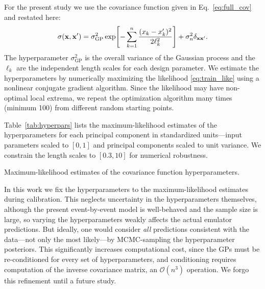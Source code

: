 \documentclass[aps,prc,reprint,superscriptaddress,amsmath]{revtex4-1}
\begin{document}
For the present study we use the covariance function given in Eq.~\eqref{eq:full_cov} and restated here:
\begin{equation*}
  \sigma(\mathbf x, \mathbf x') = \sigma_\text{GP}^2 \exp\Biggl[ -\sum_{k=1}^n \frac{(x_k - x'_k)^2}{2\ell_k^2} \Biggr] + \sigma_n^2\delta_{\mathbf x\mathbf x'}.
\end{equation*}
The hyperparameter $\sigma^2_\text{GP}$ is the overall variance of the Gaussian process and the $\ell_k$ are the independent length scales for each design parameter.
We estimate the hyperparameters by numerically maximizing the likelihood \eqref{eq:train_like} using a nonlinear conjugate gradient algorithm.
Since the likelihood may have non-optimal local extrema, we repeat the optimization algorithm many times (minimum 100) from different random starting points.

Table~\ref{tab:hyperpars} lists the maximum-likelihood estimates of the hyperparameters for each principal component in standardized units---input parameters scaled to $[0, 1]$ and principal components scaled to unit variance.
We constrain the length scales to $[0.3, 10]$ for numerical robustness.

\begin{table}
  \caption{
    \label{tab:hyperpars}
    Maximum-likelihood estimates of the covariance function hyperparameters.
  }
  
\end{table}

In this work we fix the hyperparameters to the maximum-likelihood estimates during calibration.
This neglects uncertainty in the hyperparameters themselves, although the present event-by-event model is well-behaved and the sample size is large, so varying the hyperparameters weakly affects the actual emulator predictions.
But ideally, one would consider \emph{all} predictions consistent with the data---not only the most likely---by MCMC-sampling the hyperparameter posteriors.
This significantly increases computational cost, since the GPs must be re-conditioned for every set of hyperparameters, and conditioning requires computation of the inverse covariance matrix, an $\mathcal O(n^3)$ operation.
We forgo this refinement until a future study.





\end{document}
